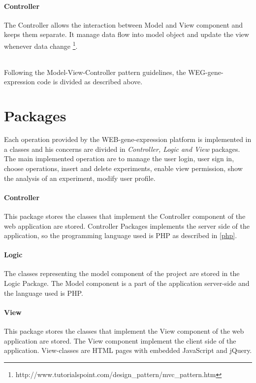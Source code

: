 \documentclass[a4paper]{report}
\begin{document}
  \paragraph{Controller} The Controller allows the interaction between Model and View component and keeps them separate. It manage data flow into model object and update the view whenever data change \footnote{http://www.tutorialspoint.com/design\_pattern/mvc\_pattern.htm}.  

\
\\Following the Model-View-Controller pattern guidelines, the WEG-gene-expression code is divided as described above.

\section{Packages}

Each operation provided by the WEB-gene-expression platform is implemented in a classes and his concerns are divided in \emph{Controller, Logic and View} packages. 
The main implemented operation are to manage the user login, user sign in, choose operations, insert and delete experiments, enable view permission, show the analysis of an experiment, modify user profile.

\paragraph{Controller} This package stores the classes that implement the Controller component of the web application  are stored. Controller Packages implements the server side of the application, so the programming language used is PHP as described in \ref{php}.

\paragraph{Logic} The classes representing the model component of the project are stored in the Logic Package. The Model component is a part of the application server-side and the language used is PHP.

\paragraph{View} This package stores the classes that implement the View component of the web application  are stored. The View component implement the client side of the application. View-classes are HTML pages with embedded JavaScript and jQuery.
\end{document}
